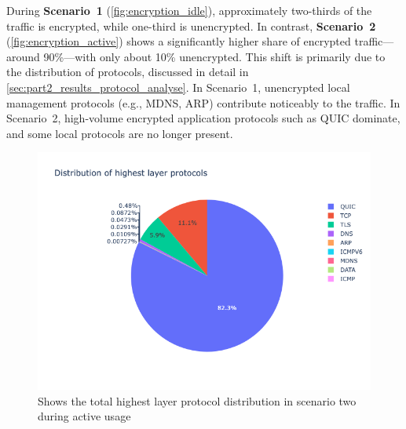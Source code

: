 \documentclass[sigconf,nonacm]{acmart}
\begin{document}
During \textbf{Scenario~1} (\cref{fig:encryption_idle}), approximately two-thirds of the traffic is encrypted, while one-third is unencrypted. In contrast, \textbf{Scenario~2} (\cref{fig:encryption_active}) shows a significantly higher share of encrypted traffic—around 90\%—with only about 10\% unencrypted. This shift is primarily due to the distribution of protocols, discussed in detail in \cref{sec:part2_results_protocol_analyse}. In Scenario~1, unencrypted local management protocols (e.g., MDNS, ARP) contribute noticeably to the traffic. In Scenario~2, high-volume encrypted application protocols such as QUIC dominate, and some local protocols are no longer present.








\begin{figure}[htbp]
    \centering
    \includegraphics[width=\columnwidth]{images/part2/active use/distributionofhighestlayerprotocols.png}
    \caption{Shows the total highest layer protocol distribution in scenario two during active usage}
    \label{fig:protocol_distribution_total_active}
\end{figure}
\end{document}
